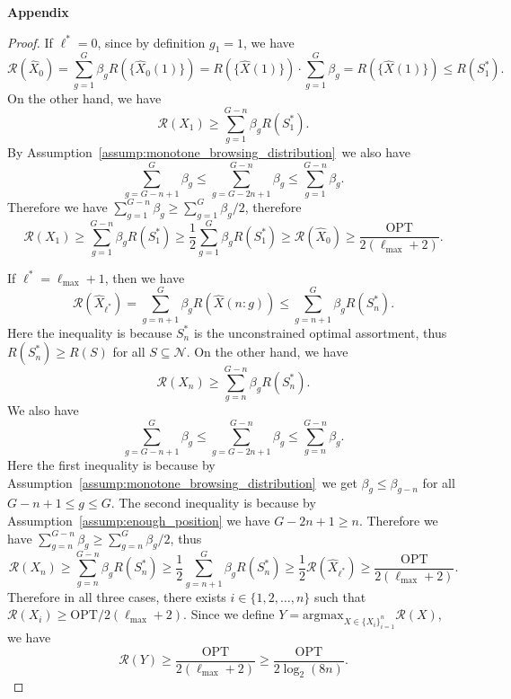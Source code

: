 \documentclass[msom,non-blindrev]{informs3} %
\theoremstyle{definition}
\begin{document}
\begin{appendices}{\Large \noindent\textbf{Appendix}}
{\begin{proof}
If $\ell^*=0$, since by definition $g_1=1$, we have
\begin{equation*}
\mathcal{R}(\hat{X}_0)=\sum_{g=1}^G \beta_g R(\{\hat{X}_0(1)\})=R(\{\hat{X}(1)\})\cdot\sum_{g=1}^G\beta_g=R(\{\hat{X}(1)\})\leq R(S_1^*).
\end{equation*}
On the other hand, we have
\begin{equation*}
\mathcal{R}(X_1)\geq \sum_{g=1}^{G-n}\beta_gR(S_1^*).
\end{equation*}
By Assumption~\ref{assump:monotone_browsing_distribution}~we also have
\begin{equation*}
\sum_{g=G-n+1}^G\beta_g\leq \sum_{g=G-2n+1}^{G-n}\beta_g\leq \sum_{g=1}^{G-n}\beta_g.
\end{equation*}
Therefore we have $\sum_{g=1}^{G-n}\beta_g\geq \sum_{g=1}^G\beta_g/2$, therefore
\begin{equation*}
\mathcal{R}(X_1)\geq \sum_{g=1}^{G-n}\beta_g R(S_1^*)\geq \dfrac{1}{2}\sum_{g=1}^G \beta_gR(S_1^*)\geq \mathcal{R}(\hat{X}_0)\geq \dfrac{\text{OPT}}{2(\ell_{\max}+2)}.
\end{equation*}

If $\ell^*=\ell_{\max}+1$, then we have
\begin{equation*}
\mathcal{R}(\hat{X}_{\ell^*})=\sum_{g=n+1}^G \beta_gR(\hat{X}(n:g))\leq \sum_{g=n+1}^G\beta_gR(S_n^*).
\end{equation*}
Here the inequality is because $S_n^*$ is the unconstrained optimal assortment, thus $R(S_n^*)\geq R(S)$ for all $S\subseteq\mathcal{N}$. On the other hand, we have
\begin{equation*}
\mathcal{R}(X_n)\geq \sum_{g=n}^{G-n}\beta_g R(S_n^*).
\end{equation*}
We also have
\begin{equation*}
\sum_{g=G-n+1}^{G}\beta_g\leq \sum_{g=G-2n+1}^{G-n}\beta_g\leq \sum_{g=n}^{G-n}\beta_g.
\end{equation*}
Here the first inequality is because by Assumption~\ref{assump:monotone_browsing_distribution}~we get $\beta_g\leq \beta_{g-n}$ for all $G-n+1\leq g\leq G$. The second inequality is because by Assumption~\ref{assump:enough_position} we have $G-2n+1\geq n$. Therefore we have $\sum_{g=n}^{G-n}\beta_g\geq \sum_{g=n}^G \beta_g/2$, thus
\begin{equation*}
\mathcal{R}(X_n)\geq \sum_{g=n}^{G-n}\beta_g R(S_n^*)\geq \dfrac{1}{2}\sum_{g=n+1}^G \beta_gR(S_n^*)\geq \dfrac{1}{2}\mathcal{R}(\hat{X}_{\ell^*})\geq \dfrac{\text{OPT}}{2(\ell_{\max}+2)}.
\end{equation*}
Therefore in all three cases, there exists $i\in\{1,2,\dots,n\}$ such that $\mathcal{R}(X_i)\geq \text{OPT}/2(\ell_{\max}+2)$. Since we define $Y=\mathrm{argmax}_{X\in\{X_i\}_{i=1}^n}\mathcal{R}(X)$, we have
\begin{equation*}
\mathcal{R}(Y)\geq \dfrac{\text{OPT}}{2(\ell_{\max}+2)}\geq \dfrac{\text{OPT}}{2\log_2(8n)}.
\end{equation*}


\end{proof}}
\end{appendices}
\end{document}
